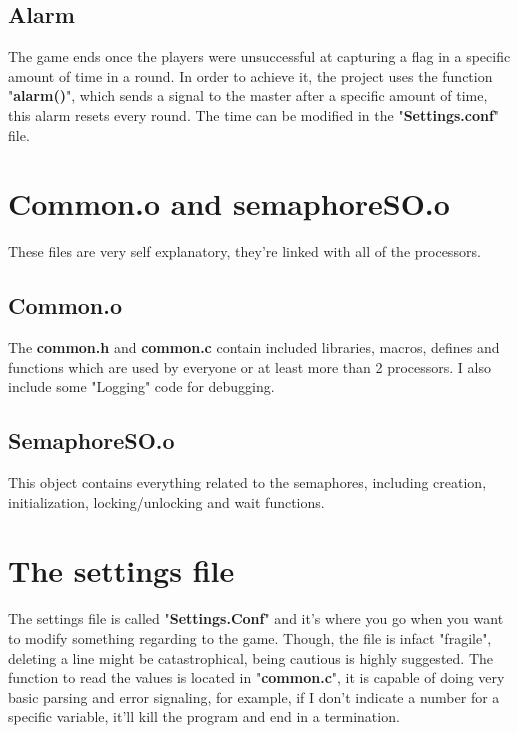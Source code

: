 \documentclass[11pt]{article}
\begin{document}
	\subsection{Alarm}
	The game ends once the players were unsuccessful at capturing a flag in a specific amount of time in a round. In order to achieve it, the project uses the function "\textbf{alarm()}", which sends a signal to the master after a specific amount of time, this alarm resets every round. The time can be modified in the "\textbf{Settings.conf}" file.
	
	\section{Common.o and semaphoreSO.o}
	
	These files are very self explanatory, they're linked with all of the processors.
	
	\subsection{Common.o}
	The \textbf{common.h} and \textbf{common.c} contain included libraries, macros, defines and functions which are used by everyone or at least more than 2 processors. I also include some "Logging" code for debugging.
	
	\subsection{SemaphoreSO.o}
	This object contains everything related to the semaphores, including creation, initialization, locking/unlocking and wait functions.
	
	\section{The settings file}
	
	The settings file is called "\textbf{Settings.Conf}" and it's where you go when you want to modify something regarding to the game. Though, the file is infact "fragile", deleting a line might be catastrophical, being cautious is highly suggested. The function to read the values is located in "\textbf{common.c}", it is capable of doing very basic parsing and error signaling, for example, if I don't indicate a number for a specific variable, it'll kill the program and end in a termination.
	
	
	
	
 
\end{document}
